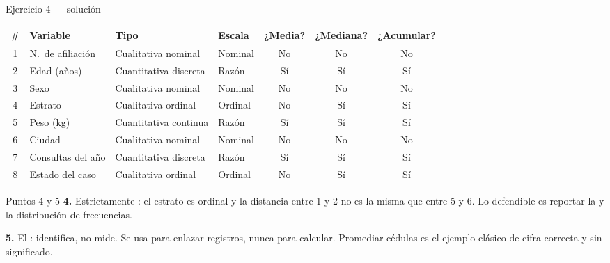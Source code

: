 \documentclass[aspectratio=169,10pt]{beamer}
\begin{document}
\begin{frame}{Ejercicio 4 — solución}
  \tiny
  \begin{center}
  \begin{tabular}{@{}clllccc@{}}
    \toprule
    \textbf{\#} & \textbf{Variable} & \textbf{Tipo} & \textbf{Escala} &
    \textbf{¿Media?} & \textbf{¿Mediana?} & \textbf{¿Acumular?} \\
    \midrule
    1 & N.\ de afiliación & Cualitativa nominal & Nominal & No & No & No \\
    2 & Edad (años)       & Cuantitativa discreta & Razón & Sí & Sí & Sí \\
    3 & Sexo              & Cualitativa nominal & Nominal & No & No & No \\
    4 & Estrato           & Cualitativa ordinal & Ordinal & No & Sí & Sí \\
    5 & Peso (kg)         & Cuantitativa continua & Razón & Sí & Sí & Sí \\
    6 & Ciudad            & Cualitativa nominal & Nominal & No & No & No \\
    7 & Consultas del año & Cuantitativa discreta & Razón & Sí & Sí & Sí \\
    8 & Estado del caso   & Cualitativa ordinal & Ordinal & No & Sí & Sí \\
    \bottomrule
  \end{tabular}
  \end{center}

  \vspace{0.1cm}
  \begin{alertblock}{Puntos 4 y 5}
    \tiny
    \textbf{4.} Estrictamente : el estrato es ordinal y la
    distancia entre 1 y 2 no es la misma que entre 5 y 6. Lo defendible es
    reportar la  y la distribución de frecuencias.

    \vspace{0.06cm}
    \textbf{5.} El : identifica, no mide. Se usa
    para enlazar registros, nunca para calcular. Promediar cédulas es el
    ejemplo clásico de cifra correcta y sin significado.
  \end{alertblock}
\end{frame}
\end{document}
